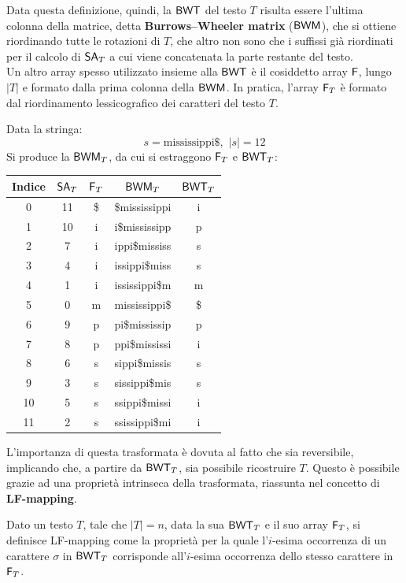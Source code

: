 Data questa definizione, quindi, la $\mbox{\rm {\sf BWT}}$ del testo $T$ risulta essere
l'ultima colonna della matrice, detta \textbf{Burrows--Wheeler matrix} ($\mbox{\rm {\sf BWM}}$),
che si ottiene riordinando tutte le  
rotazioni di $T$, che altro non sono che i suffissi già riordinati per
il calcolo di $\mbox{\rm {\sf SA}}_T$ a cui viene concatenata la parte restante del
testo.\\
Un altro array spesso utilizzato insieme alla $\mbox{\rm {\sf BWT}}$ è il cosiddetto
array $\mbox{\rm {\sf F}}$, lungo $|T|$ e formato dalla prima colonna della $\mbox{\rm {\sf BWM}}$. In pratica,
l'array $\mbox{\rm {\sf F}}_T$ è formato
dal riordinamento  
lessicografico dei caratteri del testo $T$.
\begin{esempio}
  Data la stringa:
  \[s=\mbox{mississippi\$},\,\,|s|=12\]
  Si produce la $\mbox{\rm {\sf BWM}}_T$, da cui si estraggono $\mbox{\rm {\sf F}}_T$ e $\mbox{\rm {\sf BWT}}_T$:
  \begin{table}[H]
    \centering
    \footnotesize
    \begin{tabular}{c|c|c|c|c} 
      \textbf{Indice} & $\mbox{\rm {\sf SA}}_T$ & $\mbox{\rm {\sf F}}_T$ & $\mbox{\rm {\sf BWM}}_T$
      & $\mbox{\rm {\sf BWT}}_T$\\ 
      \hline
      0 & 11 & \$ & \$mississippi & i\\
      1 & 10 & i & i\$mississipp & p\\
      2 & 7 & i & ippi\$mississ & s\\
      3 & 4 & i & issippi\$miss & s\\
      4 & 1 & i & ississippi\$m & m\\
      5 & 0 & m & mississippi\$ & \$\\
      6 & 9 & p & pi\$mississip & p\\
      7 & 8 & p & ppi\$mississi & i\\
      8 & 6 & s & sippi\$missis & s\\
      9 & 3 & s & sissippi\$mis & s\\
      10 & 5 & s & ssippi\$missi & i\\
      11 & 2 & s & ssissippi\$mi & i\\
    \end{tabular}
  \end{table}
\end{esempio}
L'importanza di questa trasformata è dovuta al fatto che sia
reversibile, implicando che, a partire da $\mbox{\rm {\sf BWT}}_T$, sia possibile
ricostruire $T$. Questo è possibile grazie ad una proprietà intrinseca della
trasformata, riassunta nel concetto di \textbf{LF-mapping}.
\begin{definizione}
  Dato un testo $T$, tale che $|T|=n$, data la sua $\mbox{\rm {\sf BWT}}_T$ e il suo array
  $\mbox{\rm {\sf F}}_T$,
  si definisce LF-mapping come la proprietà per la quale l'$i$-esima
  occorrenza di un carattere $\sigma$ in $\mbox{\rm {\sf BWT}}_T$ corrisponde all'$i$-esima
  occorrenza dello stesso carattere in $\mbox{\rm {\sf F}}_T$.
\end{definizione}

